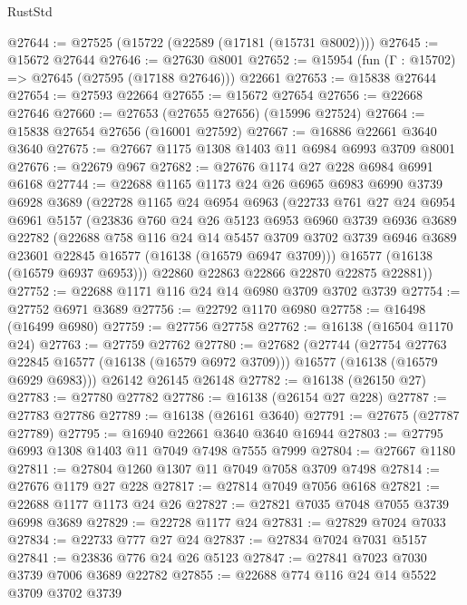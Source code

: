 \begin{lexlean}{RustStd}
\begin{coremodule}
@27644 := @27525 (@15722 (@22589 (@17181 (@15731 @8002))))
@27645 := @15672 @27644
@27646 := @27630 @8001
@27652 := @15954 (fun (Γ : @15702) => @27645 (@27595 (@17188 @27646))) @22661
@27653 := @15838 @27644
@27654 := @27593 @22664
@27655 := @15672 @27654
@27656 := @22668 @27646
@27660 := @27653 (@27655 @27656) (@15996 @27524)
@27664 := @15838 @27654 @27656 (@16001 @27592)
@27667 := @16886 @22661 @3640 @3640
@27675 := @27667 @1175 @1308 @1403 @11 @6984 @6993 @3709 @8001
@27676 := @22679 @967
@27682 := @27676 @1174 @27 @228 @6984 @6991 @6168
@27744 := @22688
    @1165
    @1173
    @24
    @26
    @6965
    @6983
    @6990
    @3739
    @6928
    @3689
    (@22728
      @1165
      @24
      @6954
      @6963
      (@22733
        @761
        @27
        @24
        @6954
        @6961
        @5157
        (@23836
          @760
          @24
          @26
          @5123
          @6953
          @6960
          @3739
          @6936
          @3689
          @22782
          (@22688
            @758
            @116
            @24
            @14
            @5457
            @3709
            @3702
            @3739
            @6946
            @3689
            @23601
            @22845
            @16577
            (@16138 (@16579 @6947 @3709)))
          @16577
          (@16138 (@16579 @6937 @6953)))
        @22860
        @22863
        @22866
        @22870
        @22875
        @22881))
@27752 := @22688 @1171 @116 @24 @14 @6980 @3709 @3702 @3739
@27754 := @27752 @6971 @3689
@27756 := @22792 @1170 @6980
@27758 := @16498 (@16499 @6980)
@27759 := @27756 @27758
@27762 := @16138 (@16504 @1170 @24)
@27763 := @27759 @27762
@27780 := @27682
    (@27744
      (@27754 @27763 @22845 @16577 (@16138 (@16579 @6972 @3709)))
      @16577
      (@16138 (@16579 @6929 @6983)))
    @26142
    @26145
    @26148
@27782 := @16138 (@26150 @27)
@27783 := @27780 @27782
@27786 := @16138 (@26154 @27 @228)
@27787 := @27783 @27786
@27789 := @16138 (@26161 @3640)
@27791 := @27675 (@27787 @27789)
@27795 := @16940 @22661 @3640 @3640 @16944
@27803 := @27795 @6993 @1308 @1403 @11 @7049 @7498 @7555 @7999
@27804 := @27667 @1180
@27811 := @27804 @1260 @1307 @11 @7049 @7058 @3709 @7498
@27814 := @27676 @1179 @27 @228
@27817 := @27814 @7049 @7056 @6168
@27821 := @22688 @1177 @1173 @24 @26
@27827 := @27821 @7035 @7048 @7055 @3739 @6998 @3689
@27829 := @22728 @1177 @24
@27831 := @27829 @7024 @7033
@27834 := @22733 @777 @27 @24
@27837 := @27834 @7024 @7031 @5157
@27841 := @23836 @776 @24 @26 @5123
@27847 := @27841 @7023 @7030 @3739 @7006 @3689 @22782
@27855 := @22688 @774 @116 @24 @14 @5522 @3709 @3702 @3739

\end{coremodule}
\end{lexlean}
